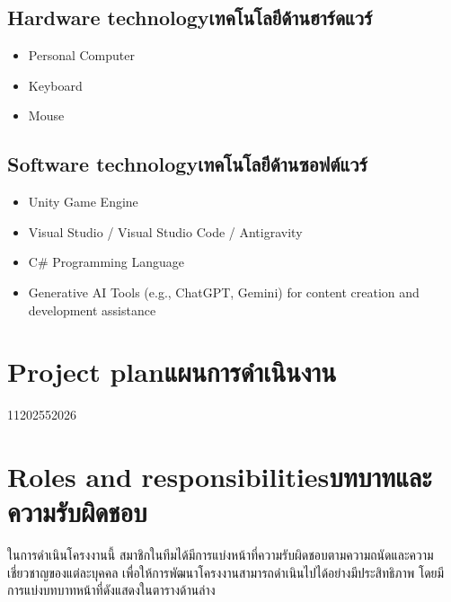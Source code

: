 \subsection{\ifenglish Hardware technology\else เทคโนโลยีด้านฮาร์ดแวร์\fi}

\begin{itemize}
    \item Personal Computer
    \item Keyboard
    \item Mouse
\end{itemize}

\subsection{\ifenglish Software technology\else เทคโนโลยีด้านซอฟต์แวร์\fi}

\begin{itemize}
    \item Unity Game Engine
    \item Visual Studio / Visual Studio Code / Antigravity
    \item C\# Programming Language
    \item Generative AI Tools (e.g., ChatGPT, Gemini) for content creation and development assistance
\end{itemize}

\section{\ifenglish Project plan\else แผนการดำเนินงาน\fi}

\begin{plan}{11}{2025}{5}{2026}
\end{plan}


\section{\ifenglish Roles and responsibilities\else บทบาทและความรับผิดชอบ\fi}

ในการดำเนินโครงงานนี้ สมาชิกในทีมได้มีการแบ่งหน้าที่ความรับผิดชอบตามความถนัดและความเชี่ยวชาญของแต่ละบุคคล เพื่อให้การพัฒนาโครงงานสามารถดำเนินไปได้อย่างมีประสิทธิภาพ โดยมีการแบ่งบทบาทหน้าที่ดังแสดงในตารางด้านล่าง

